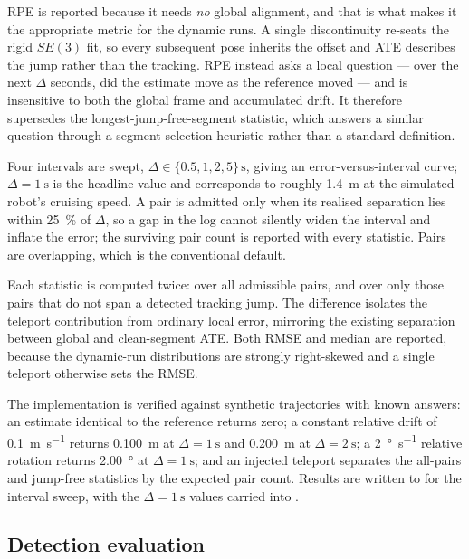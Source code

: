 RPE is reported because it needs \emph{no} global alignment, and that is what
makes it the appropriate metric for the dynamic runs. A single discontinuity
re-seats the rigid $SE(3)$ fit, so every subsequent pose inherits the offset and
ATE describes the jump rather than the tracking. RPE instead asks a local
question --- over the next $\Delta$ seconds, did the estimate move as the
reference moved --- and is insensitive to both the global frame and accumulated
drift. It therefore supersedes the longest-jump-free-segment statistic, which
answers a similar question through a segment-selection heuristic rather than a
standard definition.

Four intervals are swept, $\Delta \in \{0.5, 1, 2, 5\}\,\si{\second}$, giving
an error-versus-interval curve; $\Delta = \SI{1}{\second}$ is the headline value
and corresponds to roughly \SI{1.4}{\metre} at the simulated robot's cruising
speed. A pair is admitted only when its realised separation lies within
\SI{25}{\percent} of $\Delta$, so a gap in the log cannot silently widen the
interval and inflate the error; the surviving pair count is reported with every
statistic. Pairs are overlapping, which is the conventional default.

Each statistic is computed twice: over all admissible pairs, and over only those
pairs that do not span a detected tracking jump. The difference isolates the
teleport contribution from ordinary local error, mirroring the existing
separation between global and clean-segment ATE. Both RMSE and median are
reported, because the dynamic-run distributions are strongly right-skewed and a
single teleport otherwise sets the RMSE.

The implementation is verified against synthetic trajectories with known answers:
an estimate identical to the reference returns zero; a constant relative drift of
\SI{0.1}{\metre\per\second} returns \SI{0.100}{\metre} at
$\Delta=\SI{1}{\second}$ and \SI{0.200}{\metre} at $\Delta=\SI{2}{\second}$; a
\SI{2}{\degree\per\second} relative rotation returns \SI{2.00}{\degree} at
$\Delta=\SI{1}{\second}$; and an injected teleport separates the all-pairs and
jump-free statistics by the expected pair count. Results are written to
 for the interval sweep, with the
$\Delta=\SI{1}{\second}$ values carried into .

\subsection{Detection evaluation}

